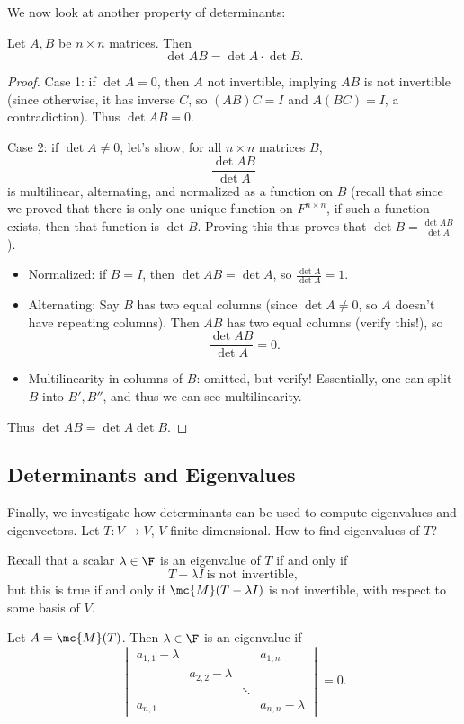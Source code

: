 \documentclass[math0540-lecture-notes.tex]{subfiles}
\begin{document}
We now look at another property of determinants: 
\begin{proposition}[]{}
  Let $A,B$ be $n\times n$ matrices. Then \[
    \det{AB}=\det{A}\cdot \det{B}
  .\] 
\end{proposition}
\begin{proof}[Proof]
  Case 1: if $\det{A}=0$, then $A$ not invertible, implying $AB$ is not invertible (since otherwise,
  it has inverse $C$, so $(AB)C=I$ and $A(BC)=I$, a contradiction). Thus $\det{AB}=0$.
  
  Case 2: if $\det{A}\neq 0$, let's show, for all $n\times n$ matrices $B$, \[
    \frac{\det{AB}}{\det{A}}
  \] is multilinear, alternating, and normalized as a function on $B$ (recall that since we proved
  that there is only one unique function on $F^{n\times n}$, if such a function exists, then that
  function is $\det{B}$. Proving this thus proves that $\det{B}=\frac{\det{AB}}{\det{A}}$).
  \begin{itemize}
    \item Normalized: if $B=I$, then $\det{AB}=\det{A}$, so $\frac{\det{A}}{\det{A}}=1$.
    \item Alternating: Say $B$ has two equal columns (since $\det{A}\neq 0$, so $A$ doesn't have
      repeating columns). Then $AB$ has two equal columns (verify this!), so \[
        \frac{\det{AB}}{\det{A}}=0
      .\] 
    \item Multilinearity in columns of $B$: omitted, but verify! Essentially, one can split $B$ into
      $B', B''$, and thus we can see multilinearity.
  \end{itemize}
  Thus $\det{AB}=\det{A}\det{B}$.
\end{proof}


\subsection{Determinants and Eigenvalues}

Finally, we investigate how determinants can be used to compute eigenvalues and eigenvectors. Let
$T:V\to V$, $V$ finite-dimensional. How to find eigenvalues of $T$?

Recall that a scalar $\lambda\in \F$ is an eigenvalue of $T$ if and only if \[
  T-\lambda I ~\text{is not invertible}
,\] but this is true if and only if $\mc{M}(T-\lambda I)$ is not invertible, with respect to some
basis of $V$.

Let $A=\mc{M}(T)$. Then $\lambda\in \F$ is an eigenvalue if \[
  \begin{vmatrix} a_{1,1}-\lambda & & & a_{1,n}\\ & a_{2,2}-\lambda & & \\ & &
  \ddots & \\ a_{n,1} & & & a_{n,n}-\lambda\end{vmatrix} =0
.\] 
\end{document}
